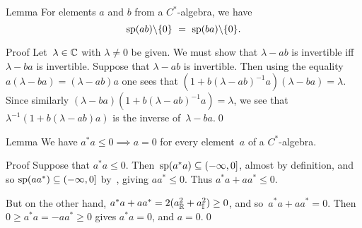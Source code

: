 \documentclass[a]{subfiles}
\begin{document}
\begin{parsec}
\begin{point}{Lemma}%
For elements $a$ and $b$ from a $C^*$-algebra,
we have
\begin{equation*}
\spec(ab)\backslash\{0\}\ =\ \spec(ba)\backslash\{0\}.
\end{equation*}
\begin{point}{Proof}%
Let~$\lambda\in \mathbb{C}$ with $\lambda\neq 0$ be given.
We must show that $\lambda - ab$ is invertible
iff $\lambda - ba$ is invertible.
Suppose that $\lambda-ab$ is invertible.
Then using the equality $a(\lambda-ba)=(\lambda-ab)a$
one sees that $(1+b(\lambda-ab)^{-1}a)(\lambda-ba)=\lambda$.
Since similarly $(\lambda-ba)(1+b(\lambda-ab)^{-1}a)=\lambda$,
we see that $\lambda^{-1}(1+b(\lambda-ab)a)$
is the inverse of~$\lambda-ba$.\qed
\end{point}
\end{point}
\begin{point}{Lemma}%
We have $a^*a  \leq 0\implies a=0$
for every element~$a$ of a $C^*$-algebra.
\begin{point}{Proof}%
Suppose that $a^*a\leq 0$.
Then~$\mathrm{sp}(a^*a)\subseteq (-\infty,0]$, almost by definition,
and so $\mathrm{sp}(aa^*)\subseteq (-\infty,0]$ by~,
giving $aa^*\leq 0$.
Thus $a^*a+aa^*\leq 0$.

But on the other hand, 
$a^*a+aa^* = 2(a_{\mathbb{R}}^2 + a_{\mathbb{I}}^2) \geq 0$,
and so~$a^*a+aa^*=0$.
Then $0\geq a^*a=-aa^*\geq 0$ gives $a^*a=0$,
and $a=0$.\qed
\end{point}
\end{point}
\end{parsec}
\end{document}
